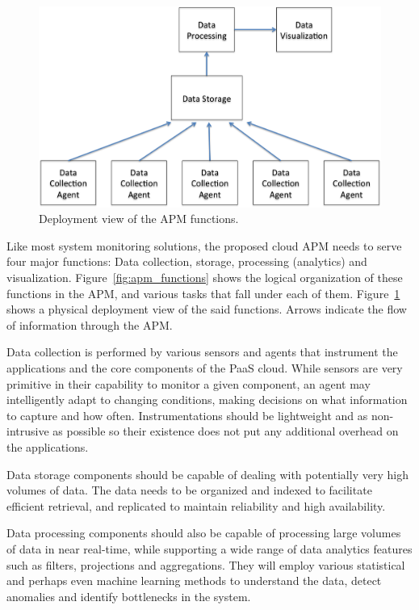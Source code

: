 \documentclass[11pt]{article}
\begin{document}
\begin{figure}
\centering
\includegraphics[scale=0.5]{apm_layout}
\caption{Deployment view of the APM functions.}
\label{fig:apm_layout}
\end{figure}

Like most system monitoring solutions, the proposed cloud APM needs to serve four major functions: Data
collection, storage, processing (analytics) and visualization. Figure~\ref{fig:apm_functions} shows the
logical organization of these functions in the APM, and various tasks that fall under each of them.
Figure~\ref{fig:apm_layout} shows a physical deployment view of the said functions. Arrows indicate
the flow of information through the APM.

Data collection is performed by various sensors and agents that instrument the applications and the
core components of the PaaS cloud. While sensors are very primitive in their capability to monitor
a given component, an agent may intelligently adapt to changing conditions, making decisions on
what information to capture and how often. Instrumentations should be lightweight and as non-intrusive
as possible so their existence does not put any additional overhead on the applications.

Data storage components should be capable of
dealing with potentially very high volumes of data. The data needs to be organized and indexed
to facilitate efficient retrieval, and replicated to maintain reliability and high availability. 

Data processing components should also be capable of processing large volumes of data in near real-time,
while supporting a wide range of data analytics features such as filters, projections and aggregations. 
They will employ various statistical and perhaps even machine learning methods to understand the
data, detect anomalies and identify bottlenecks in the system.
\end{document}
